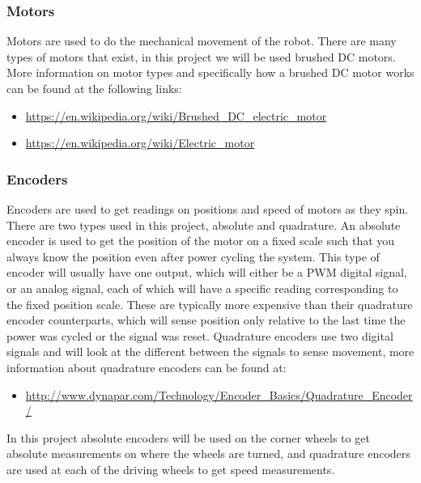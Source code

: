 \documentclass[12pt]{article}
\begin{document}
\subsubsection{Motors}
Motors are used to do the mechanical movement of the robot. There are many types of motors that exist, in this project we will be used brushed DC motors. More information on motor types and specifically how a brushed DC motor works can be found at the following links:
\begin{itemize}
	\item \href{https://en.wikipedia.org/wiki/Brushed_DC_electric_motor}{https://en.wikipedia.org/wiki/Brushed\_DC\_electric\_motor}
	\item \href{https://en.wikipedia.org/wiki/Electric_motor}{https://en.wikipedia.org/wiki/Electric\_motor}
\end{itemize}

\subsubsection{Encoders}
Encoders are used to get readings on positions and speed of motors as they spin. There are two types used in this project, absolute and quadrature. An absolute encoder is used to get the position of the motor on a fixed scale such that you always know the position even after power cycling the system. This type of encoder will usually have one output, which will either be a PWM digital signal, or an analog signal, each of which will have a specific reading corresponding to the fixed position scale. These are typically more expensive than their quadrature encoder counterparts, which will sense position only relative to the last time the power was cycled or the signal was reset. Quadrature encoders use two digital signals and will look at the different between the signals to sense movement, more information about quadrature encoders can be found at: 

\begin{itemize}
	\item \href{http://www.dynapar.com/Technology/Encoder_Basics/Quadrature_Encoder/}{http://www.dynapar.com/Technology/Encoder\_Basics/Quadrature\_Encoder/}  
\end{itemize}

\noindent In this project absolute encoders will be used on the corner wheels to get absolute measurements on where the wheels are turned, and quadrature encoders are used at each of the driving wheels to get speed measurements.
\end{document}
